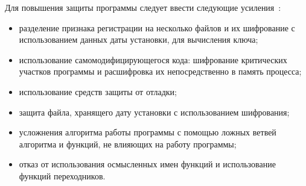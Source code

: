 Для повышения защиты программы следует ввести следующие усиления~\cite{4}:
\vspace{-5mm}
\begin{itemize}
\item разделение признака регистрации на несколько файлов и их
  шифрование с использованием данных даты установки, для вычисления
  ключа;
\item использование самомодифицирующегося кода: шифрование \linebreak
  критических участков программы и расшифровка их
  непосредственно в память процесса;
\item использование средств защиты от отладки;
\item защита файла, хранящего дату установки с использованием
  шифрования;
\item усложнения алгоритма работы программы с помощью ложных ветвей
  алгоритма и функций, не влияющих на работу программы;
\item отказ от использования осмысленных имен функций и использование
  функций переходников.
\end{itemize}

\cleardoublepage


